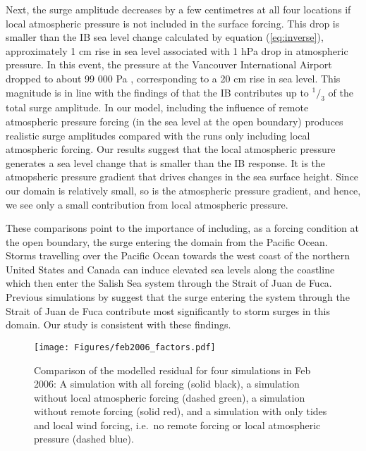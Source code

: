 \documentclass[letterpaper]{tATO2e}
\begin{document}
Next, the surge amplitude decreases by a few centimetres at all four locations if local atmospheric pressure is not included in the surface forcing. This drop is smaller than the IB sea level change calculated by equation (\ref{eq:inverse}), approximately 1 cm rise in sea level associated with 1 hPa drop in atmospheric pressure. In this event, the pressure at the Vancouver International Airport dropped to about 99 000 Pa \citep{ECClimateArchive}, corresponding to a 20 cm rise in sea level. This magnitude is in line with the findings of \citet{murty1995storm} that the IB contributes up to $^1/_3$ of the total surge amplitude. In our model, including the influence of remote atmospheric pressure forcing (in the sea level at the open boundary) produces realistic surge amplitudes compared with the runs only including local atmospheric forcing. Our results suggest that the local atmospheric pressure generates a sea level change that is smaller than the IB response. {\color{red} It is the atmopsheric pressure gradient that drives changes in the sea surface height. Since our domain is relatively small, so is the atmospheric pressure gradient, and hence, we see only a small contribution from local atmospheric pressure. } 


These comparisons point to the importance of including, as a forcing condition at the open boundary, the surge entering the domain from the Pacific Ocean. Storms travelling over the Pacific Ocean towards the west coast of the northern United States and Canada can induce elevated sea levels along the coastline which then enter the Salish Sea system through the Strait of Juan de Fuca. Previous simulations by \citet{murty1995storm} suggest that the surge entering the system through the Strait of Juan de Fuca contribute most significantly to storm surges in this domain. {\color{red} Our study is consistent with these findings.}  

\begin{figure}
\centering
\texttt{[image: Figures/feb2006\_factors.pdf]}
\caption{Comparison of the modelled residual for four simulations in Feb 2006: A simulation with all forcing (solid black), a simulation without local atmospheric forcing (dashed green), a simulation without remote forcing (solid red), and a simulation with only tides and local wind forcing, i.e.\ no remote forcing or local atmospheric pressure (dashed blue). }
\label{fig:factors}
\end{figure}
\end{document}
